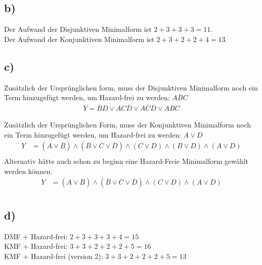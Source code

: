 \documentclass[]{article}
\newcommand{\V}{\lor}
\newcommand{\A}{\land}
\newcommand{\T}[1]{\overline{#1}}
\begin{document}
\subsection*{b)}
	Der Aufwand der Disjunktiven Minimalform ist $2+3+3+3 = 11$.\\
	Der Aufwand der Konjunktiven Minimalform ist $2+3+2+2+4 = 13$.\\

\subsection*{c)}
	Zusätzlich der Ursprünglichen form, muss der Disjunktiven Minimalform noch ein Term hinzugefügt werden, um Hazard-frei zu werden:
	$A \T{B} C$
	\begin{align*}
		Y = \T{B}D \V AC\T{D} \V A\T{C}D \V A \T{B} C
	\end{align*}

	Zusätzlich der Ursprünglichen Form, muss der Konjunktiven Minimalform  noch ein Term hinzugefügt werden, um Hazard-frei zu werden:
	$A \V D$
	\begin{align*}
		Y &= (A\V\T{B}) \A (\T{B}\V \T{C}\V \T{D}) \A (C\V D) \A (B\V D) \A (A \V D)\\
	\end{align*}
	Alternativ hätte auch schon zu beginn eine Hazard-Freie Minimalform gewählt werden können.
	\begin{align*}
		Y &= (A\V\T{B}) \A (\T{B}\V \T{C}\V \T{D}) \A (C\V D) \A (A \V D)\\
	\end{align*}

\subsection*{d)}
	DMF + Hazard-frei: $2+3+3+3+4 = 15$\\
	KMF + Hazard-frei: $3+3+2+2+2+5 = 16$\\
	KMF + Hazard-frei (version 2): $3+3+2+2+2+5 = 13$\\
\end{document}
